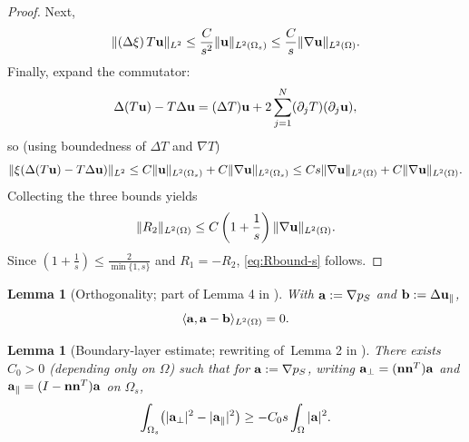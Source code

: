 \documentclass{article}
\newtheorem{lemma}[theorem]{Lemma}          %
\theoremstyle{definition}                   %
\begin{document}
\begin{proof}
Next,
\[
\|(\Delta\xi)\,T{\bf u}\|_{L^2}
\le \frac{C}{s^2}\|{\bf u}\|_{L^2(\Omega_s)}
\le \frac{C}{s}\|\nabla{\bf u}\|_{L^2(\Omega)}.
\]
%
Finally, expand the commutator:
\[
\Delta(T{\bf u})-T\Delta{\bf u}
=
(\Delta T){\bf u}+2\sum_{j=1}^N (\partial_j T)(\partial_j{\bf u}),
\]
so (using boundedness of $\Delta T$ and $\nabla T$)
\[
\|\xi(\Delta(T{\bf u})-T\Delta{\bf u})\|_{L^2}
\le
C\|{\bf u}\|_{L^2(\Omega_s)}+C\|\nabla{\bf u}\|_{L^2(\Omega_s)}
\le
Cs\|\nabla{\bf u}\|_{L^2(\Omega)}+C\|\nabla{\bf u}\|_{L^2(\Omega)}.
\]
%
Collecting the three bounds yields
\[
\|R_2\|_{L^2(\Omega)}
\le
C\left(1+\frac{1}{s}\right)\|\nabla{\bf u}\|_{L^2(\Omega)}.
\]
Since 
$ \left(1+\frac{1}{s}\right)  
\le \frac{2}{\min\{1,s \}}$ and 
$R_1=-R_2$, \eqref{eq:Rbound-s} follows.
\end{proof}


\begin{lemma}[Orthogonality; part of Lemma 4 in \cite{LiuLiuPego2007}]\label{lem:orth}
With ${\bf a}:=\nabla p_S$ and ${\bf b}:=\Delta{\bf u}_\parallel$,
\begin{equation}\label{eq:orth}
\langle{\bf a},{\bf a}-{\bf b}\rangle_{L^2(\Omega)}=0.
\end{equation}
\end{lemma}



\begin{lemma}[Boundary-layer estimate; rewriting of\ Lemma 2 in \cite{LiuLiuPego2007}]\label{lem:layer}
There exists $C_0>0$ (depending only on $\Omega$) such that for ${\bf a}:=\nabla p_S$,
writing ${\bf a}_\perp=({\bf n}{\bf n}^T){\bf a}$ and
${\bf a}_\parallel=(I-{\bf n}{\bf n}^T){\bf a}$ on $\Omega_s$,
\begin{equation}\label{eq:layer}
\int_{\Omega_s}\bigl(|{\bf a}_\perp|^2-|{\bf a}_\parallel|^2\bigr)
\ge - C_0 s\int_\Omega |{\bf a}|^2 .
\end{equation}
\end{lemma}
\end{document}
